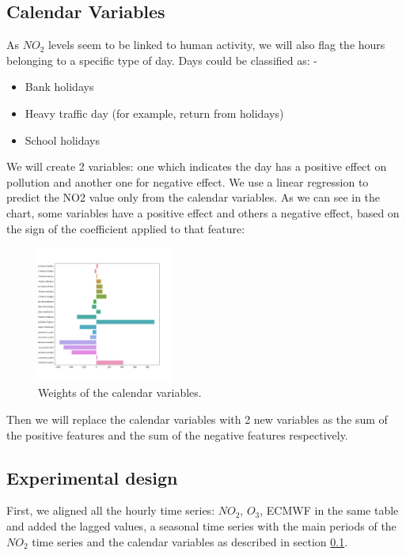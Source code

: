 \documentclass[a4paper,twocolumn,5p]{elsarticle}
\begin{document}
\subsection{Calendar Variables}
\label{sec:cal_data}

As $NO_2$ levels seem to be linked to human activity, we will also flag the hours 
belonging to a specific type of day. Days could be classified as:
-\begin{itemize}
  \item Bank holidays
  \item Heavy traffic day (for example, return from holidays)
  \item School holidays
\end{itemize} 

We will create 2 variables: one which indicates the day has a positive effect on pollution and 
another one for negative effect. We use a linear regression to predict the NO2 value only from the calendar variables.
As we can see in the chart, some variables have a positive effect and others a negative effect, based on the
sign of the coefficient applied to that feature:

\begin{figure}
  \caption{Weights of the calendar variables.}
  \centering
  \includegraphics[width=0.4\textwidth]{calweights}
\end{figure}

Then we will replace the calendar variables with 2 new variables as the sum of the positive 
features and the sum of the negative features respectively.

\subsection{Experimental design}
\label{sec:experimental-design}

First, we aligned all the hourly time series: $NO_2$, $O_3$, ECMWF in the same table 
and added the lagged values, a seasonal time series with the main periods of the $NO_2$ time series
and the calendar variables as described in section \ref{sec:cal_data}.
\end{document}
